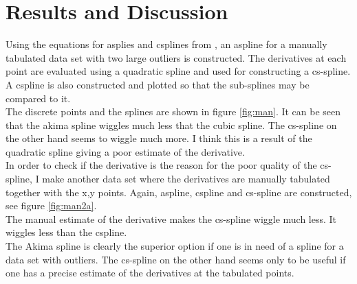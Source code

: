\documentclass{article}
\begin{document}
\section{Results and Discussion}
Using the equations for asplies and csplines from \cite{Prakprog}, an aspline for a 
manually tabulated data set with two large outliers is constructed. The derivatives at each point 
are evaluated using a quadratic spline and used for constructing a cs-spline. A cspline is also constructed 
and plotted so that the sub-splines may be compared to it.
\\ 
The discrete points and the splines are shown in figure \ref{fig:man}.
It can be seen that the akima spline wiggles much less that the cubic spline. The cs-spline on the other 
hand seems to wiggle much more. I think this is a result of the quadratic spline giving a poor estimate of 
the derivative.
\\
In order to check if the derivative is the reason for the poor quality of the cs-spline, I make another data 
set where the derivatives are manually tabulated together with the x,y points. Again, aspline, cspline and 
cs-spline are constructed, see figure \ref{fig:man2a}.
\\
The manual estimate of the derivative makes the cs-spline wiggle much less. It wiggles less than the cspline.
\\
The Akima spline is clearly the superior option if one is in need of a spline for a data set with outliers. 
The cs-spline on the other hand seems only to be useful if one has a precise estimate of the derivatives at 
the tabulated points.
\clearpage
\end{document}
